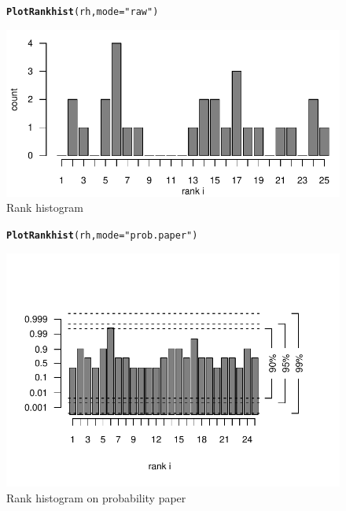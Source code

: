 \documentclass[article]{jss}\usepackage{graphicx, color}
\makeatletter
\def\maxwidth{ %
  \ifdim\Gin@nat@width>\linewidth
    \linewidth
  \else
    \Gin@nat@width
  \fi
}
\newcommand{\hlfunctioncall}[1]{\textcolor[rgb]{0,0.501960784313725,0.752941176470588}{\textbf{#1}}}%
\newcommand{\hlstring}[1]{\textcolor[rgb]{0.650980392156863,0.52156862745098,0}{#1}}%
\newenvironment{kframe}{%
 \def\at@end@of@kframe{}%
 \ifinner\ifhmode%
  \def\at@end@of@kframe{\end{minipage}}%
  \begin{minipage}{\columnwidth}%
 \fi\fi%
 \def\FrameCommand##1{\hskip\@totalleftmargin \hskip-\fboxsep
 \colorbox{shadecolor}{##1}\hskip-\fboxsep
     \hskip-\linewidth \hskip-\@totalleftmargin \hskip\columnwidth}%
 \MakeFramed {\advance\hsize-\width
   \@totalleftmargin\z@ \linewidth\hsize
   \@setminipage}}%
 {\par\unskip\endMakeFramed%
 \at@end@of@kframe}
\newenvironment{knitrout}{}{} %
\makeatother
\begin{document}
\begin{figure}
\begin{center}
%
\begin{knitrout}
\color{fgcolor}\begin{kframe}
\begin{alltt}
\hlfunctioncall{PlotRankhist}(rh, mode=\hlstring{"raw"})
\end{alltt}
\end{kframe}
\includegraphics[width=\maxwidth]{figure/rank-hist} 

\end{knitrout}

%
\end{center}
\caption{Rank histogram}
\label{fig:rank-hist}
\end{figure}


\begin{figure}
\begin{center}
%
\begin{knitrout}
\color{fgcolor}\begin{kframe}
\begin{alltt}
\hlfunctioncall{PlotRankhist}(rh, mode=\hlstring{"prob.paper"})
\end{alltt}
\end{kframe}
\includegraphics[width=\maxwidth]{figure/rank-hist-pp} 

\end{knitrout}

%
\end{center}
\caption{Rank histogram on probability paper}
\label{fig:rank-hist-pp}
\end{figure}
\end{document}
